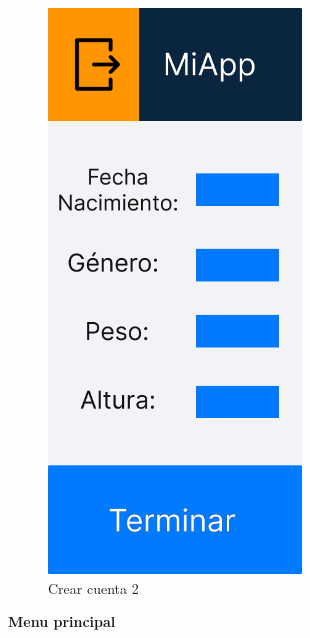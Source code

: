 \begin{figure}[H]
   \centering
    \includegraphics[width=0.6\textwidth]{fotos/Frame 25.png}
    \caption{Crear cuenta 2}
    \label{fig:Crear cuenta 2}
\end{figure}

\textbf{Menu principal}

